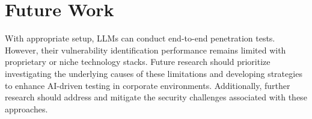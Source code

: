 \section{Future Work}
\label{sec:chapter06:future_work}
With appropriate setup, \ac{LLM}s can conduct end-to-end penetration tests. However, their vulnerability identification performance remains limited with proprietary or niche technology stacks. Future research should prioritize investigating the underlying causes of these limitations and developing strategies to enhance \ac{AI}-driven testing in corporate environments. Additionally, further research should address and mitigate the security challenges associated with these approaches.